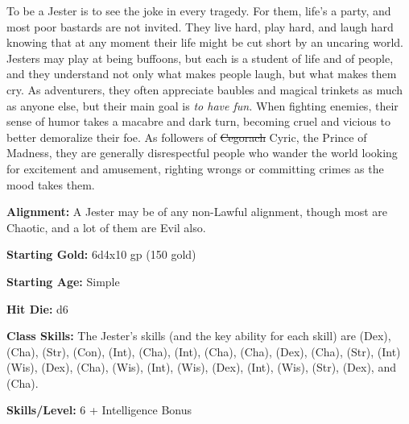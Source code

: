 
To be a Jester is to see the joke in every tragedy. For them, life's a party, and most poor bastards are not invited. They live hard, play hard, and laugh hard knowing that at any moment their life might be cut short by an uncaring world. Jesters may play at being buffoons, but each is a student of life and of people, and they understand not only what makes people laugh, but what makes them cry. As adventurers, they often appreciate baubles and magical trinkets as much as anyone else, but their main goal is \textit{to have fun.} When fighting enemies, their sense of humor takes a macabre and dark turn, becoming cruel and vicious to better demoralize their foe. As followers of \sout{Cegorach} Cyric, the Prince of Madness, they are generally disrespectful people who wander the world looking for excitement and amusement, righting wrongs or committing crimes as the mood takes them.

\textbf{Alignment:} A Jester may be of any non-Lawful alignment, though most are Chaotic, and a lot of them are Evil also.

\textbf{Starting Gold:} 6d4x10 gp (150 gold)

\textbf{Starting Age:} Simple

\textbf{Hit Die:} d6

\textbf{Class Skills:} The Jester's skills (and the key ability for each skill) are  (Dex),  (Cha),  (Str),  (Con),  (Int),  (Cha),  (Int),  (Cha),  (Cha),  (Dex),  (Cha),  (Str),  (Int)  (Wis),  (Dex),  (Cha),  (Wis),  (Int),  (Wis),  (Dex),  (Int),  (Wis),  (Str),  (Dex), and  (Cha).

\textbf{Skills/Level:} 6 + Intelligence Bonus

\modebab{}
\poorfor{}
\goodref{}
\poorwil{}


